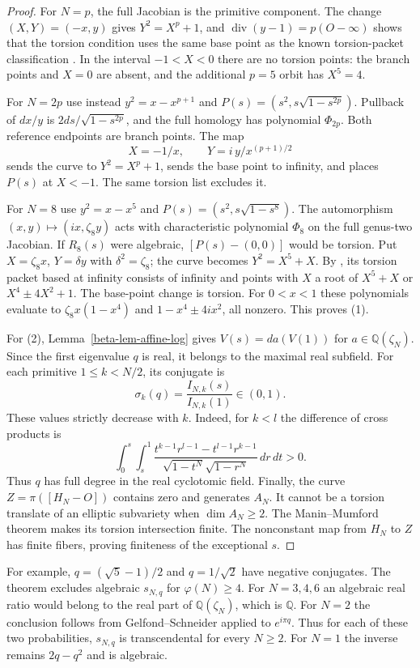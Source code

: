 \documentclass[11pt,a4paper]{article}
\theoremstyle{definition}
\theoremstyle{remark}
\numberwithin{equation}{section}
\begin{document}
\begin{proof}
For $N=p$, the full Jacobian is the primitive component.  The change
$(X,Y)=(-x,y)$ gives $Y^2=X^p+1$, and
$\operatorname{div}(y-1)=p(O-\infty)$ shows that the torsion condition
uses the same base point as the known torsion-packet classification
\cite[Theorem~6.2.21]{beta-arul}.  In the interval $-1<X<0$ there are
no torsion points: the branch points and $X=0$ are absent, and the
additional $p=5$ orbit has $X^5=4$.

For $N=2p$ use instead $y^2=x-x^{p+1}$ and
$P(s)=(s^2,s\sqrt{1-s^{2p}})$.  Pullback of $dx/y$ is
$2ds/\sqrt{1-s^{2p}}$, and the full homology has polynomial
$\Phi_{2p}$.  Both reference endpoints are branch points.  The map
\[
X=-1/x,\qquad Y=i\,y/x^{(p+1)/2}
\]
sends the curve to $Y^2=X^p+1$, sends the base point to infinity, and
places $P(s)$ at $X<-1$.  The same torsion list excludes it.

For $N=8$ use $y^2=x-x^5$ and
$P(s)=(s^2,s\sqrt{1-s^8})$.  The automorphism
$(x,y)\mapsto(ix,\zeta_8y)$ acts with characteristic polynomial
$\Phi_8$ on the full genus-two Jacobian.  If $R_8(s)$ were algebraic,
$[P(s)-(0,0)]$ would be torsion.  Put
$X=\zeta_8x$, $Y=\delta y$ with $\delta^2=\zeta_8$; the curve becomes
$Y^2=X^5+X$.  By \cite[Theorem~(0.3)]{beta-boxall-grant}, its torsion
packet based at infinity consists of infinity and points with $X$ a
root of $X^5+X$ or $X^4\pm4X^2+1$.  The base-point change is torsion.
For $0<x<1$ these polynomials evaluate to
$\zeta_8x(1-x^4)$ and $1-x^4\pm4ix^2$, all nonzero.  This proves (1).

For (2), Lemma~\ref{beta-lem-affine-log} gives
$V(s)=da(V(1))$ for $a\in\mathbb Q(\zeta_N)$.  Since the first
eigenvalue $q$ is real, it belongs to the maximal real subfield.
For each primitive $1\le k<N/2$, its conjugate is
\[
\sigma_k(q)=\frac{I_{N,k}(s)}{I_{N,k}(1)}\in(0,1).
\]
These values strictly decrease with $k$.  Indeed, for $k<l$ the
difference of cross products is
\[
\int_0^s\int_s^1
\frac{t^{k-1}r^{l-1}-t^{l-1}r^{k-1}}
{\sqrt{1-t^N}\sqrt{1-r^N}}\,dr\,dt>0.
\]
Thus $q$ has full degree in the real cyclotomic field.
Finally, the curve $Z=\pi([H_N-O])$ contains zero and generates $A_N$.
It cannot be a torsion translate of an elliptic subvariety when
$\dim A_N\ge2$.  The Manin--Mumford theorem \cite{beta-roessler}
makes its torsion intersection finite.  The nonconstant map from $H_N$
to $Z$ has finite fibers, proving finiteness of the exceptional $s$.
\end{proof}

For example, $q=(\sqrt5-1)/2$ and $q=1/\sqrt2$ have negative conjugates.
The theorem excludes algebraic $s_{N,q}$ for $\varphi(N)\ge4$.
For $N=3,4,6$ an algebraic real ratio would belong to the real part of
$\mathbb Q(\zeta_N)$, which is $\mathbb Q$.  For $N=2$ the conclusion
follows from Gelfond--Schneider applied to $e^{i\pi q}$.  Thus for each
of these two probabilities, $s_{N,q}$ is transcendental for every $N\ge2$.
For $N=1$ the inverse remains $2q-q^2$ and is algebraic.
\end{document}
